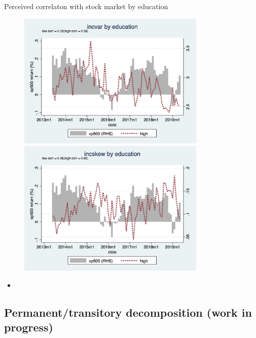 \documentclass{beamer}
\begin{document}
\begin{frame}{Perceived correlaton with stock market by education}
	\begin{figure}
		\centering
		\label{ts_stk_edu_g}
		\includegraphics[width=0.8\textwidth, height=\0.4\textheight]{figures/ts_incvar_edu_g_mean_stk} \\
			\includegraphics[width=0.8\textwidth, height=\0.4\textheight]{figures/ts_incskew_edu_g_mean_stk} 
	\end{figure}
	\begin{itemize}
		\item 
	\end{itemize}
\end{frame}


\subsection{Permanent/transitory decomposition (work in progress)}
\end{document}
